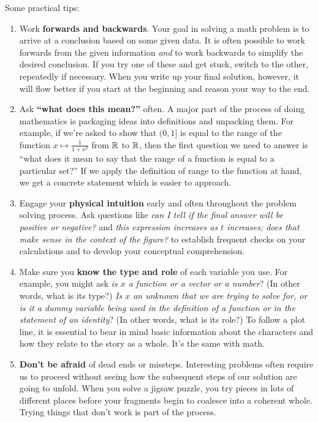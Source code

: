 \documentclass[prettycode,shellescape]{watsonbook}
\begin{document}
Some practical tips: 
\begin{enumerate}[topsep=-4pt, itemsep=4pt]
\item Work \textbf{forwards and backwards}. Your goal in solving a
  math problem is to arrive at a conclusion based on some given
  data. It is often possible to work forwards from the given
  information \textit{and} to work backwards to simplify the desired
  conclusion. If you try one of these and get stuck, switch to the
  other, repeatedly if necessary. When you write up your final
  solution, however, it will flow better if you start at the beginning
  and reason your way to the end.
\item Ask \textbf{``what does this mean?''} often. A major part of the
  process of doing mathematics is packaging ideas into definitions and
  unpacking them. For example, if we're asked to show that $(0,1]$
  is equal to the range of the function $x\mapsto \frac{1}{1+x^2}$
  from $\mathbb{R}$ to $\mathbb{R}$, then the first question we need to answer is
  ``what does it mean to say that the range of a function is equal
  to a particular set?'' If we apply the definition of range to the
  function at hand, we get a concrete statement which is easier to
  approach.
\item Engage your \textbf{physical intuition} early and often
  throughout the problem solving process. Ask questions like
  \textit{can I tell if the final answer will be positive or
    negative?} and \textit{this expression increases as $t$
    increases; does that make sense in the context of the figure?} to
  establish frequent checks on your calculations and to develop your
  conceptual comprehension.
\item Make sure you \textbf{know the type and role} of each variable
  you use. For example, you might ask \textit{is $x$ a function or a
    vector or a number}? (In other words, what is its type?)
  \textit{Is $x$ an unknown that we are trying to solve for, or is
    it a dummy variable being used in the definition of a function
    or in the statement of an identity}? (In other words, what is
  its role?) To follow a plot line, it is essential to bear in mind
  basic information about the characters and how they relate to the
  story as a whole. It's the same with math.
\item \textbf{Don't be afraid} of dead ends or missteps. Interesting
  problems often require us to proceed without seeing how the
  subsequent steps of our solution are going to unfold. When you
  solve a jigsaw puzzle, you try pieces in lots of different places
  before your fragments begin to coalesce into a coherent
  whole. Trying things that don't work is part of the process.
\end{enumerate}
\end{document}
